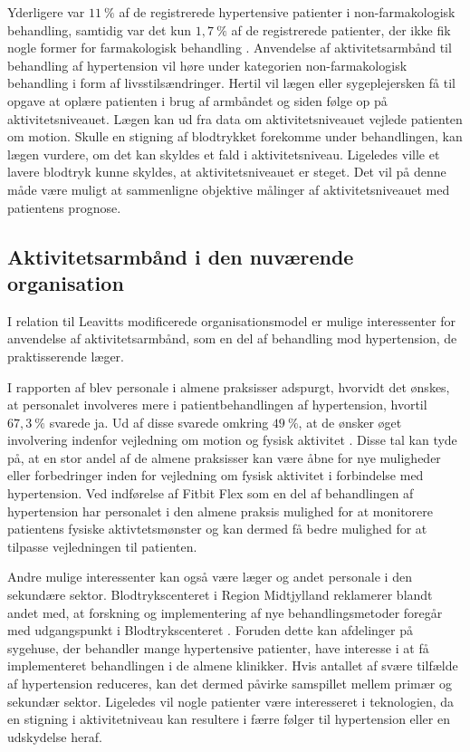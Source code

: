 Yderligere var $11~\%$ af de registrerede hypertensive patienter i non-farmakologisk behandling, samtidig var det kun $1,7~\%$ af de registrerede patienter, der ikke fik nogle former for farmakologisk behandling \citep{munck2007}.
Anvendelse af aktivitetsarmbånd til behandling af hypertension vil høre under kategorien non-farmakologisk behandling i form af livsstilsændringer. Hertil vil lægen eller sygeplejersken få til opgave at oplære patienten i brug af armbåndet og siden følge op på aktivitetsniveauet. Lægen kan ud fra data om aktivitetsniveauet vejlede patienten om motion. 
Skulle en stigning af blodtrykket forekomme under behandlingen, kan lægen vurdere, om det kan skyldes et fald i aktivitetsniveau. Ligeledes ville et lavere blodtryk kunne skyldes, at aktivitetsniveauet er steget. Det vil på denne måde være muligt at sammenligne objektive målinger af aktivitetsniveauet med patientens prognose. 

\subsection{Aktivitetsarmbånd i den nuværende organisation}
I relation til Leavitts modificerede organisationsmodel er mulige interessenter for anvendelse af aktivitetsarmbånd, som en del af behandling mod hypertension, de praktisserende læger.

I rapporten af \citeauthor{munck2007} blev personale i almene praksisser adspurgt, hvorvidt det ønskes, at personalet involveres mere i patientbehandlingen af hypertension, hvortil $67,3~\%$ svarede ja. Ud af disse svarede omkring $49~\%$, at de ønsker øget involvering indenfor vejledning om motion og fysisk aktivitet \citep{munck2007}. Disse tal kan tyde på, at en stor andel af de almene praksisser kan være åbne for nye muligheder eller forbedringer inden for vejledning om fysisk aktivitet i forbindelse med hypertension. Ved indførelse af Fitbit Flex som en del af behandlingen af hypertension har personalet i den almene praksis mulighed for at monitorere patientens fysiske aktivtetsmønster og kan dermed få bedre mulighed for at tilpasse vejledningen til patienten. 

Andre mulige interessenter kan også være læger og andet personale i den sekundære sektor. Blodtrykscenteret i Region Midtjylland reklamerer blandt andet med, at forskning og implementering af nye behandlingsmetoder foregår med udgangspunkt i Blodtrykscenteret \citep{aarhusuniversitetshospital}. Foruden dette kan afdelinger på sygehuse, der behandler mange hypertensive patienter, have interesse i at få implementeret behandlingen i de almene klinikker. Hvis antallet af svære tilfælde af hypertension reduceres, kan det dermed påvirke samspillet mellem primær og sekundær sektor. Ligeledes vil nogle patienter være interesseret i teknologien, da en stigning i aktivitetniveau kan resultere i færre følger til hypertension eller en udskydelse heraf. 

